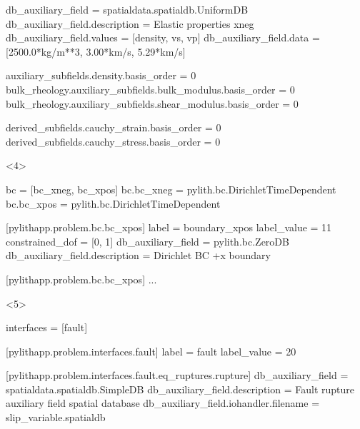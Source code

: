 \documentclass[aspectratio=169]{beamer}
\begin{document}
\begin{frame}[t,fragile]
\begin{minipage}[t]{0.60\textwidth}
\begin{onlyenv}
\begin{cfgcode}
        db_auxiliary_field = spatialdata.spatialdb.UniformDB
        db_auxiliary_field.description = Elastic properties xneg
        db_auxiliary_field.values = [density, vs, vp]
        db_auxiliary_field.data = [2500.0*kg/m**3, 3.00*km/s, 5.29*km/s]

        auxiliary_subfields.density.basis_order = 0
        bulk_rheology.auxiliary_subfields.bulk_modulus.basis_order = 0
        bulk_rheology.auxiliary_subfields.shear_modulus.basis_order = 0

        derived_subfields.cauchy_strain.basis_order = 0
        derived_subfields.cauchy_stress.basis_order = 0
      \end{cfgcode}
    \end{onlyenv}
    \begin{onlyenv}<4>
      \begin{cfgcode}
        bc = [bc_xneg, bc_xpos]
        bc.bc_xneg = pylith.bc.DirichletTimeDependent
        bc.bc_xpos = pylith.bc.DirichletTimeDependent
        
        [pylithapp.problem.bc.bc_xpos]
        label = boundary_xpos
        label_value = 11
        constrained_dof = [0, 1]
        db_auxiliary_field = pylith.bc.ZeroDB
        db_auxiliary_field.description = Dirichlet BC +x boundary

        [pylithapp.problem.bc.bc_xpos]
        ...
      \end{cfgcode}
    \end{onlyenv}
    \begin{onlyenv}<5>
      \begin{cfgcode}
        interfaces = [fault]

        [pylithapp.problem.interfaces.fault]
        label = fault
        label_value = 20

        [pylithapp.problem.interfaces.fault.eq_ruptures.rupture]
        db_auxiliary_field = spatialdata.spatialdb.SimpleDB
        db_auxiliary_field.description = Fault rupture auxiliary field spatial database
        db_auxiliary_field.iohandler.filename = slip_variable.spatialdb
      \end{cfgcode}
    \end{onlyenv}
  \end{minipage}

  
\end{frame}
\end{document}
